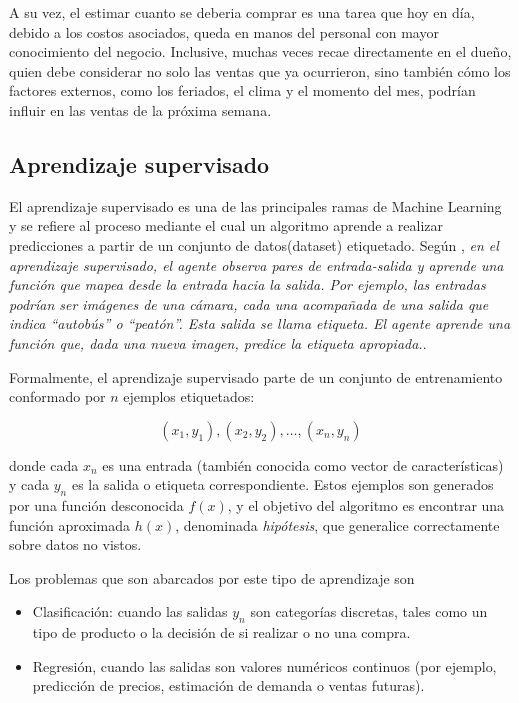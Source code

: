 A su vez, el estimar cuanto se deberia comprar es una tarea que hoy en día, debido a los costos asociados, queda en manos del personal con mayor conocimiento del negocio. Inclusive, muchas veces recae directamente en el dueño, quien debe considerar no solo las ventas que ya ocurrieron, sino también cómo los factores externos, como los feriados, el clima y el momento del mes, podrían influir en las ventas de la próxima semana.

\subsection{Aprendizaje supervisado}

El aprendizaje supervisado es una de las principales ramas de Machine Learning y se refiere al proceso mediante el cual un algoritmo aprende a realizar predicciones a partir de un conjunto de datos(dataset) etiquetado. Según \parencite{russell2022ai}, \guillemotleft{}\emph{en el aprendizaje supervisado, el agente observa pares de entrada-salida y aprende una función que mapea desde la entrada hacia la salida. Por ejemplo, las entradas podrían ser imágenes de una cámara, cada una acompañada de una salida que indica \textquotedblleft autobús\textquotedblright{} o \textquotedblleft peatón\textquotedblright{}. Esta salida se llama etiqueta. El agente aprende una función que, dada una nueva imagen, predice la etiqueta apropiada.}\guillemotright{}.

Formalmente, el aprendizaje supervisado parte de un conjunto de entrenamiento conformado por $n$ ejemplos etiquetados:

\[(x_1, y_1), (x_2, y_2), \ldots, (x_n, y_n)\]

\noindent donde cada $x_n$ es una entrada (también conocida como vector de características) y cada $y_n$ es la salida o etiqueta correspondiente. Estos ejemplos son generados por una función desconocida $f(x)$, y el objetivo del algoritmo es encontrar una función aproximada $h(x)$, denominada \emph{hipótesis}, que generalice correctamente sobre datos no vistos.

Los problemas que son abarcados por este tipo de aprendizaje son

 \begin{itemize}
    \item Clasificación: cuando las salidas $y_n$ son categorías discretas, tales como un tipo de producto o la decisión de si realizar o no una compra.

    \item Regresión, cuando las salidas son valores numéricos continuos (por ejemplo, predicción de precios, estimación de demanda o ventas futuras).
\end{itemize}

